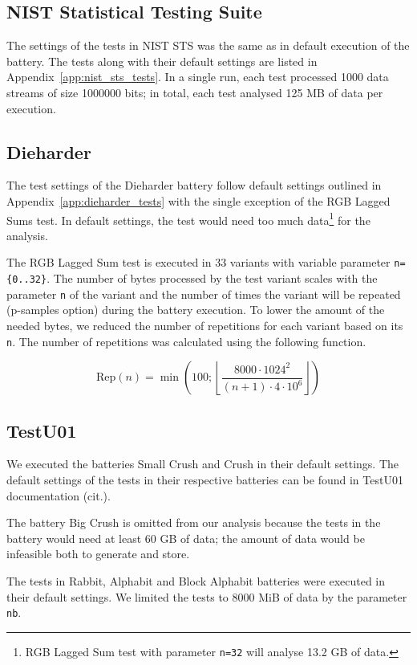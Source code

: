 \documentclass[
  digital,  	%
  color,		%
  oneside,   	%
  12pt,
  nocover,
  notable,
  nolof,
  nolot,
]{fithesis3}
\theoremstyle{definition}
\theoremstyle{remark}
\begin{document}
\subsection*{NIST Statistical Testing Suite}
The settings of the tests in NIST STS was the same as in default execution of the battery. The tests along with their default settings are listed in Appendix~\ref{app:nist_sts_tests}. In a single run, each test processed 1000 data streams of size 1000000 bits; in total, each test analysed 125 MB of data per execution.

\subsection*{Dieharder}
The test settings of the Dieharder battery follow default settings outlined in Appendix~\ref{app:dieharder_tests} with the single exception of the RGB Lagged Sums test. In default settings, the test would need too much data\footnote{RGB Lagged Sum test with parameter \texttt{n=32} will analyse 13.2 GB of data.} for the analysis. 

The RGB Lagged Sum test is executed in 33 variants with variable parameter \texttt{n=\{0..32\}}. The number of bytes processed by the test variant scales with the parameter \texttt{n} of the variant and the number of times the variant will be repeated (p-samples option) during the battery execution. To lower the amount of the needed bytes, we reduced the number of repetitions for each variant based on its \texttt{n}. The number of repetitions was calculated using the following function.

$$
\text{Rep}(n) = \min\left(100 ; \left\lfloor \frac{ 8000 \cdot 1024^{2} }{ (n + 1) \cdot 4 \cdot 10^{6} } \right\rfloor \right)
$$

\subsection*{TestU01}
We executed the batteries Small Crush and Crush in their default settings. The default settings of the tests in their respective batteries can be found in TestU01 documentation (cit.).

The battery Big Crush is omitted from our analysis because the tests in the battery would need at least 60 GB of data; the amount of data would be infeasible both to generate and store.

The tests in Rabbit, Alphabit and Block Alphabit batteries were executed in their default settings. We limited the tests to 8000 MiB of data by the parameter \texttt{nb}.
\end{document}
